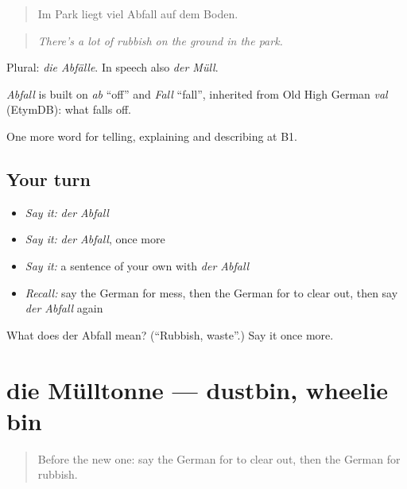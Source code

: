\begin{quote}
Im Park liegt viel Abfall auf dem Boden.
\end{quote}

\begin{quote}
\emph{There's a lot of rubbish on the ground in the park.}
\end{quote}

Plural: \emph{die Abfälle}. In speech also \emph{der Müll}.

\begin{cousinweb}
\emph{Abfall} is built on \emph{ab} \textquotedblleft{}off\textquotedblright{} and \emph{Fall} \textquotedblleft{}fall\textquotedblright{}, inherited from Old High German \emph{val} (EtymDB): what falls off.
\end{cousinweb}

\begin{grammarlens}[title={What you've built}]
One more word for telling, explaining and describing at B1.
\end{grammarlens}

\subsection*{Your turn}
\begin{itemize}
\raggedright
  \item \emph{Say it:} \emph{der Abfall}
  \item \emph{Say it:} \emph{der Abfall}, once more
  \item \emph{Say it:} a sentence of your own with \emph{der Abfall}
  \item \emph{Recall:} say the German for mess, then the German for to clear out, then say \emph{der Abfall} again
\end{itemize}

\begin{tcolorbox}[breakable,colback=teal!4,colframe=teal!35!black,title={Before you move on}]
What does der Abfall mean? (\textquotedblleft{}Rubbish, waste\textquotedblright{}.) Say it once more.
\end{tcolorbox}
\section[die Mülltonne]{die Mülltonne — dustbin, wheelie bin}

\label{lesson:GE-C528-muelltonne}



\begin{quote}
Before the new one: say the German for to clear out, then the German for rubbish.
\end{quote}

